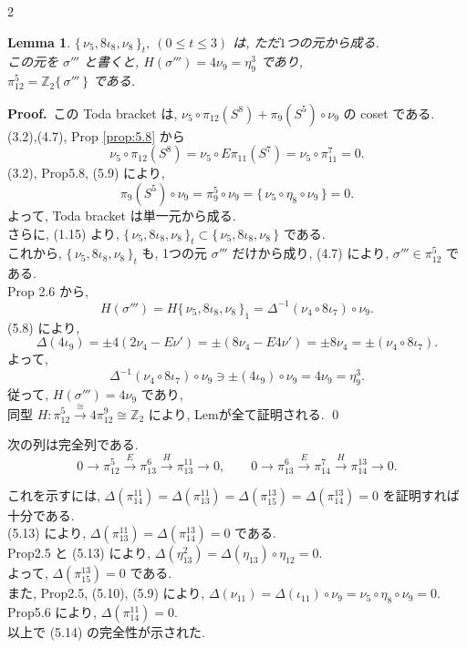 \documentclass[10pt, leqno]{ltjsarticle}
\newcommand{\toda}[1]{\{\,#1\,\}}              %
\newcommand{\todai}[2][]{\{\,#2\,\}_{#1}}      %
\newcommand{\gen}[1]{\{\,#1\,\}}       %
\newcommand{\pis}[2]{\pi_{#1}(#2)}       %
\newcommand{\pit}[2]{\pi_{#1}^{#2}}
\numberwithin{equation}{section}
\theoremstyle{plain}
\newtheorem{lemma}[theorem]{Lemma}
\theoremstyle{definition}
\theoremstyle{remark}
\begin{document}
\begin{paracol}{2}

\begin{lemma}\label{lemma:5.13}
\(\todai[t]{\nu_5,8\iota_8,\nu_8},\ (0\leq t\leq3)\) 
は, ただ$1$つの元から成る. \\
この元を \(\sigma'''\) と書くと, 
\(H(\sigma''')=4\nu_9=\eta_9^3\) であり, \\
\(\pi_{12}^5=\mathbb{Z}_2\gen{\sigma'''}\)
である. 
\end{lemma}

\noindent
\textbf{Proof.}\ 
この Toda bracket は,
\(\nu_5\circ \pi_{12}(S^{8})+\pi_{9}(S^{5})\circ \nu_9\) の coset である. \\
(3.2),(4.7), Prop \ref{prop:5.8} から 
\[
\nu_5\circ\pis{12}{S^{8}}
=\nu_5\circ E\pis{11}{S^{7}}
=\nu_5\circ \pit{11}{7}=0.
\]
(3.2), Prop5.8, (5.9) により, 
\[
\pi_{9}(S^{5})\circ\nu_9=\pi_9^5\circ\nu_9
=\gen{\nu_5\circ \eta_8\circ \nu_9}=0 .
\]
よって, Toda bracket は単一元から成る. \\
さらに, (1.15) より,
\(\todai[t]{\nu_5,8\iota_8,\nu_8}
\subset \toda{ \nu_5,8\iota_8,\nu_8}\) である. \\
これから, \(\todai[t]{\nu_5,8\iota_8,\nu_8}\) も, 
1つの元 \(\sigma'''\) だけから成り, 
(4.7) により, \(\sigma'''\in\pi_{12}^5\) である. \\
Prop 2.6 から, 
\[
H(\sigma''')
= H\todai[1]{\nu_5, 8\iota_8, \nu_8}
= \Delta^{-1}(\nu_4\circ 8\iota_7)\circ \nu_9 .
\]
(5.8) により, 
\[
\Delta(4\iota_9)=\pm4(2\nu_4-E\nu')
=\pm(8\nu_4-E4\nu')
=\pm8\nu_4
=\pm(\nu_4\circ8\iota_7) .
\]
よって, 
\[
\Delta^{-1}(\nu_4\circ8\iota_7)\circ\nu_9
\ni\pm(4\iota_9)\circ\nu_9
=4\nu_9
=\eta_9^3 .
\]
従って, \(H(\sigma''')=4\nu_9\) であり, \\
同型 \(H:\pi^{5}_{12}
\xrightarrow{\cong}4\pi^{9}_{12}
\cong\mathbb Z_2\) により,
Lemが全て証明される. 
\qed

次の列は完全列である.
\begin{equation}\label{eq:5.14}
0\to \pi^{5}_{12}\xrightarrow{E}\pi^{6}_{13}\xrightarrow{H}\pi^{11}_{13}\to0,
\qquad
0\to \pi^{6}_{13}\xrightarrow{E}\pi^{7}_{14}\xrightarrow{H}\pi^{13}_{14}\to0.
\end{equation}

\noindent
これを示すには, 
\(\Delta(\pi_{14}^{11})=\Delta(\pi_{13}^{11})
=\Delta(\pi_{15}^{13})=\Delta(\pi_{14}^{13})=0\)
を証明すれば十分である. \\
(5.13) により, \(\Delta(\pi_{13}^{11})=\Delta(\pi_{14}^{13})=0\) である. \\
Prop2.5 と (5.13) により, 
\(\Delta(\eta_{13}^2)=\Delta(\eta_{13})\circ\eta_{12}=0 .\)\\
よって, \(\Delta(\pi_{15}^{13})=0\) である. \\
また, Prop2.5, (5.10), (5.9) により, 
\(\Delta(\nu_{11})=\Delta(\iota_{11})\circ\nu_9
=\nu_5\circ\eta_8\circ\nu_9=0 .\)\\
Prop5.6 により, \(\Delta(\pi_{14}^{11})=0 .\)\\
以上で (5.14) の完全性が示された. 


\end{paracol}
\end{document}
